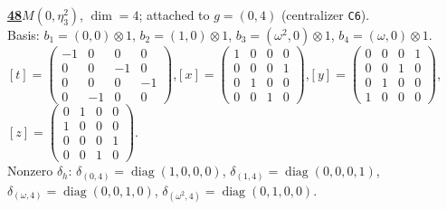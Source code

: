 \begin{samepage}\noindent\textbf{\underline{48}}\quad $M(0,\eta^{2}_{3})$, $\dim=4$; attached to $g=(0,4)$ (centralizer \texttt{C6}).\\
Basis: $b_{1}=(0,0)\otimes 1$, $b_{2}=(1,0)\otimes 1$, $b_{3}=(\omega^2,0)\otimes 1$, $b_{4}=(\omega,0)\otimes 1$.\\
$[t]=\left(\begin{smallmatrix} -1 & 0 & 0 & 0 \\ 0 & 0 & -1 & 0 \\ 0 & 0 & 0 & -1 \\ 0 & -1 & 0 & 0 \end{smallmatrix}\right)$,\quad $[x]=\left(\begin{smallmatrix} 1 & 0 & 0 & 0 \\ 0 & 0 & 0 & 1 \\ 0 & 1 & 0 & 0 \\ 0 & 0 & 1 & 0 \end{smallmatrix}\right)$,\quad $[y]=\left(\begin{smallmatrix} 0 & 0 & 0 & 1 \\ 0 & 0 & 1 & 0 \\ 0 & 1 & 0 & 0 \\ 1 & 0 & 0 & 0 \end{smallmatrix}\right)$,\quad $[z]=\left(\begin{smallmatrix} 0 & 1 & 0 & 0 \\ 1 & 0 & 0 & 0 \\ 0 & 0 & 0 & 1 \\ 0 & 0 & 1 & 0 \end{smallmatrix}\right)$.\\
Nonzero $\delta_h$: $\delta_{(0,4)}=\operatorname{diag}(1,0,0,0)$, $\delta_{(1,4)}=\operatorname{diag}(0,0,0,1)$, $\delta_{(\omega,4)}=\operatorname{diag}(0,0,1,0)$, $\delta_{(\omega^2,4)}=\operatorname{diag}(0,1,0,0)$.\end{samepage}
\medskip

